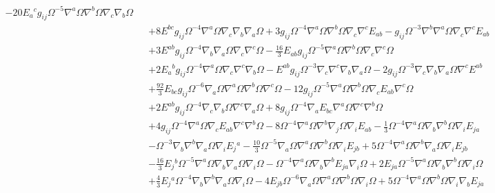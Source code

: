 \documentclass[10pt,letterpaper]{article}
\numberwithin{equation}{section}
\begin{document}
\begin{eqnarray}
- 20 E_{a}{}^{c} g_{ij} \Omega^{-5} \nabla^{a}\Omega \nabla^{b}\Omega \nabla_{c}\nabla_{b}\Omega\nonumber\\
&& + 8 E^{bc} g_{ij} \Omega^{-4} \nabla^{a}\Omega \nabla_{c}\nabla_{b}\nabla_{a}\Omega
+ 3 g_{ij} \Omega^{-4} \nabla^{a}\Omega \nabla^{b}\Omega \nabla_{c}\nabla^{c}E_{ab}
-  g_{ij} \Omega^{-3} \nabla^{b}\nabla^{a}\Omega \nabla_{c}\nabla^{c}E_{ab}\nonumber\\
&& + 3 E^{ab} g_{ij} \Omega^{-4} \nabla_{b}\nabla_{a}\Omega \nabla_{c}\nabla^{c}\Omega
-  \tfrac{16}{3} E_{ab} g_{ij} \Omega^{-5} \nabla^{a}\Omega \nabla^{b}\Omega \nabla_{c}\nabla^{c}\Omega\nonumber\\
&& + 2 E_{a}{}^{b} g_{ij} \Omega^{-4} \nabla^{a}\Omega \nabla_{c}\nabla^{c}\nabla_{b}\Omega
-  E^{ab} g_{ij} \Omega^{-3} \nabla_{c}\nabla^{c}\nabla_{b}\nabla_{a}\Omega
- 2 g_{ij} \Omega^{-3} \nabla_{c}\nabla_{b}\nabla_{a}\Omega \nabla^{c}E^{ab}\nonumber\\
&& + \tfrac{92}{3} E_{bc} g_{ij} \Omega^{-6} \nabla_{a}\Omega \nabla^{a}\Omega \nabla^{b}\Omega \nabla^{c}\Omega
- 12 g_{ij} \Omega^{-5} \nabla^{a}\Omega \nabla^{b}\Omega \nabla_{c}E_{ab} \nabla^{c}\Omega\nonumber\\
&& + 2 E^{ab} g_{ij} \Omega^{-4} \nabla_{c}\nabla_{b}\Omega \nabla^{c}\nabla_{a}\Omega
+ 8 g_{ij} \Omega^{-4} \nabla_{a}E_{bc} \nabla^{a}\Omega \nabla^{c}\nabla^{b}\Omega\nonumber\\
&& + 4 g_{ij} \Omega^{-4} \nabla^{a}\Omega \nabla_{c}E_{ab} \nabla^{c}\nabla^{b}\Omega
- 8 \Omega^{-4} \nabla^{a}\Omega \nabla^{b}\nabla_{j}\Omega \nabla_{i}E_{ab}
-  \tfrac{1}{3} \Omega^{-4} \nabla^{a}\Omega \nabla_{b}\nabla^{b}\Omega \nabla_{i}E_{ja}\nonumber\\
&& -  \Omega^{-3} \nabla_{b}\nabla^{b}\nabla_{a}\Omega \nabla_{i}E_{j}{}^{a}
-  \tfrac{10}{3} \Omega^{-5} \nabla_{a}\Omega \nabla^{a}\Omega \nabla^{b}\Omega \nabla_{i}E_{jb}
+ 5 \Omega^{-4} \nabla^{a}\Omega \nabla^{b}\nabla_{a}\Omega \nabla_{i}E_{jb}\nonumber\\
&& -  \tfrac{16}{3} E_{j}{}^{b} \Omega^{-5} \nabla^{a}\Omega \nabla_{b}\nabla_{a}\Omega \nabla_{i}\Omega
-  \Omega^{-4} \nabla^{a}\Omega \nabla_{b}\nabla^{b}E_{ja} \nabla_{i}\Omega
+ 2 E_{ja} \Omega^{-5} \nabla^{a}\Omega \nabla_{b}\nabla^{b}\Omega \nabla_{i}\Omega\nonumber\\
&& + \tfrac{4}{3} E_{j}{}^{a} \Omega^{-4} \nabla_{b}\nabla^{b}\nabla_{a}\Omega \nabla_{i}\Omega
- 4 E_{jb} \Omega^{-6} \nabla_{a}\Omega \nabla^{a}\Omega \nabla^{b}\Omega \nabla_{i}\Omega
+ 5 \Omega^{-4} \nabla^{a}\Omega \nabla^{b}\Omega \nabla_{i}\nabla_{b}E_{ja}\nonumber\\

\end{eqnarray}
\end{document}
